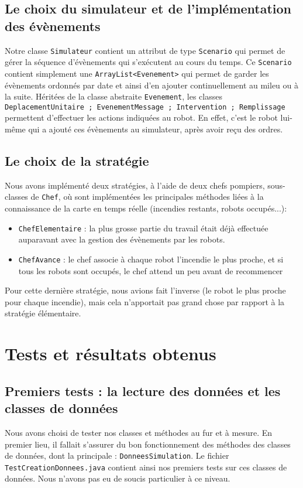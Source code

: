 \documentclass[12pt]{article}
\begin{document}
\subsection{Le choix du simulateur et de l'implémentation des évènements}
Notre classe {\tt Simulateur} contient un attribut de type {\tt Scenario} qui permet de gérer la séquence d'évènements qui s'exécutent au cours du temps. Ce {\tt Scenario} contient simplement une {\tt ArrayList<Evenement>} qui permet de garder les évènements ordonnés par date et ainsi d'en ajouter continuellement au mileu ou à la suite.
Héritées de la classe abstraite {\tt Evenement}, les classes {\tt DeplacementUnitaire ; EvenementMessage ; Intervention ; Remplissage} permettent d'effectuer les actions indiquées au robot. En effet, c'est le robot lui-même qui a ajouté ces évènements au simulateur, après avoir reçu des ordres.

\subsection{Le choix de la stratégie}
Nous avons implémenté deux stratégies, à l'aide de deux chefs pompiers, sous-classes de {\tt Chef}, où sont implémentées les principales méthodes liées à la connaissance de la carte en temps réelle (incendies restants, robots occupés...):
\begin{itemize}
  \item {\tt ChefElementaire} : la plus grosse partie du travail était déjà effectuée auparavant avec la gestion des évènements par les robots.
  \item {\tt ChefAvance} : le chef associe à chaque robot l'incendie le plus proche, et si tous les robots sont occupés, le chef attend un peu avant de recommencer
\end{itemize}
Pour cette dernière stratégie, nous avions fait l'inverse (le robot le plus proche pour chaque incendie), mais cela n'apportait pas grand chose par rapport à la stratégie élémentaire.


\section{Tests et résultats obtenus}

\subsection{Premiers tests : la lecture des données et les classes de données}

Nous avons choisi de tester nos classes et méthodes au fur et à mesure. En premier lieu, il fallait s'assurer du bon fonctionnement des méthodes des classes de données, dont la principale : {\tt DonneesSimulation}. Le fichier {\tt TestCreationDonnees.java} contient ainsi nos premiers tests sur ces classes de données. Nous n'avons pas eu de soucis particulier à ce niveau.
\end{document}
